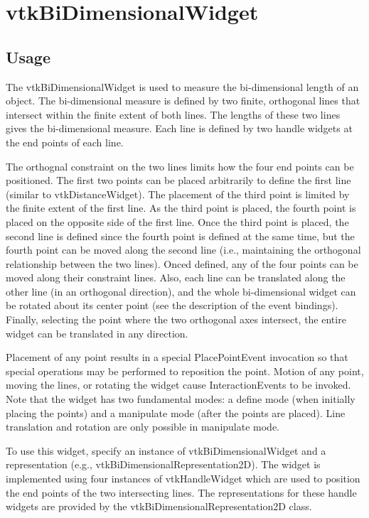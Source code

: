 \section{vtkBiDimensionalWidget}

\subsection{Usage}

 The vtkBiDimensionalWidget is used to measure the bi-dimensional length of
 an object. The bi-dimensional measure is defined by two finite,
 orthogonal lines that intersect within the finite extent of both lines.
 The lengths of these two lines gives the bi-dimensional measure. Each line
 is defined by two handle widgets at the end points of each line.

 The orthognal constraint on the two lines limits how the four end points
 can be positioned. The first two points can be placed arbitrarily to
 define the first line (similar to vtkDistanceWidget). The placement of the
 third point is limited by the finite extent of the first line. As the
 third point is placed, the fourth point is placed on the opposite side of
 the first line. Once the third point is placed, the second line is defined
 since the fourth point is defined at the same time, but the fourth point
 can be moved along the second line (i.e., maintaining the orthogonal
 relationship between the two lines). Onced defined, any of the four points
 can be moved along their constraint lines. Also, each line can be translated
 along the other line (in an orthogonal direction), and the whole
 bi-dimensional widget can be rotated about its center point (see the description
 of the event bindings). Finally, selecting the point where the two orthogonal
 axes intersect, the entire widget can be translated in any direction.

 Placement of any point results in a special PlacePointEvent invocation so
 that special operations may be performed to reposition the point. Motion
 of any point, moving the lines, or rotating the widget cause
 InteractionEvents to be invoked. Note that the widget has two fundamental
 modes: a define mode (when initially placing the points) and a manipulate
 mode (after the points are placed). Line translation and rotation are only
 possible in manipulate mode.
 
 To use this widget, specify an instance of vtkBiDimensionalWidget and a
 representation (e.g., vtkBiDimensionalRepresentation2D). The widget is
 implemented using four instances of vtkHandleWidget which are used to
 position the end points of the two intersecting lines. The representations
 for these handle widgets are provided by the
 vtkBiDimensionalRepresentation2D class.

